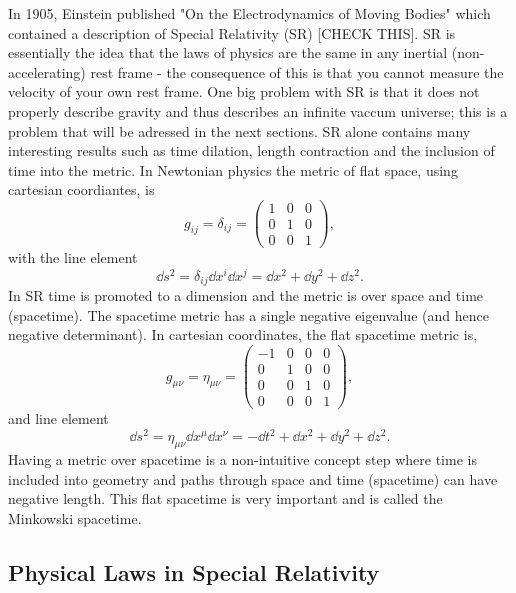 In 1905, Einstein published "On the Electrodynamics of Moving Bodies" which contained a description of Special Relativity (SR) [CHECK THIS]. SR is essentially the idea that the laws of physics are the same in any inertial (non-accelerating) rest frame - the consequence of this is that you cannot measure the velocity of your own rest frame. One big problem with SR is that it does not properly describe gravity and thus describes an infinite vaccum universe; this is a problem that will be adressed in the next sections. SR alone contains many interesting results such as time dilation, length contraction and the inclusion of time into the metric. In Newtonian physics the metric of flat space, using cartesian coordiantes, is 
\begin{equation}
g_{ij} = \delta_{ij} = \begin{pmatrix} 1 & 0 & 0 \\ 0 & 1 & 0 \\ 0 & 0 & 1 \end{pmatrix},
\end{equation}
with the line element
\begin{equation}
\dd s ^2 = \delta_{ij} \dd x^i \dd x^j = \dd x^2 + \dd y^2 + \dd z^2.
\end{equation}
In SR time is promoted to a dimension and the metric is over space and time (spacetime). The spacetime metric has a single negative eigenvalue (and hence negative determinant). In cartesian coordinates, the flat spacetime metric is,
\begin{equation}
g_{\mu\nu} = \eta_{\mu\nu} = \begin{pmatrix} -1 &0 &0 &0\\ 0 & 1 & 0 & 0 \\ 0 & 0 & 1 & 0 \\ 0 & 0 & 0 & 1 \end{pmatrix},
\end{equation}
and line element
\begin{equation}
\dd s ^2 = \eta_{\mu\nu} \dd x^\mu \dd x^\nu = -\dd t^2 + \dd x^2 + \dd y^2 + \dd z^2.
\end{equation}
Having a metric over spacetime is a non-intuitive concept step where time is included into geometry and paths through space and time (spacetime) can have negative length. This flat spacetime is very important and is called the Minkowski spacetime. 


\subsection{Physical Laws in Special Relativity}

